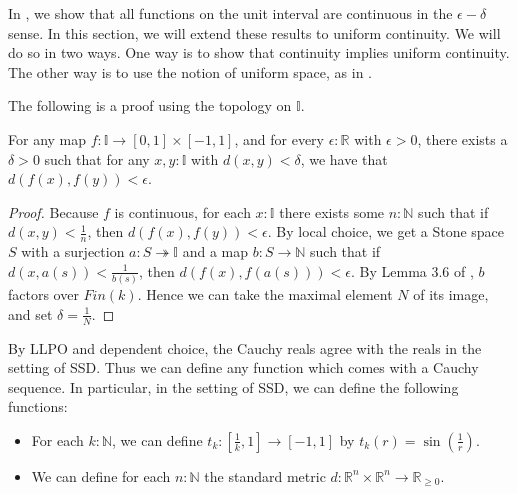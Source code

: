 In \cite{synthetic-stone-duality}, we show that all functions on the unit interval are continuous in the $\epsilon-\delta$ sense. In this section, we will extend these results to uniform continuity. We will do so in two ways. One way is to show that continuity implies uniform continuity. The other way is to use the notion of uniform space, as in \parencite[Ch2]{BourbakiTopologyCh1To4}. 



The following is a proof using the topology on $\mathbb I$. 
\begin{lemma}\label{uniformContinuity}
  For any map $f:\mathbb I \to [0,1] \times [-1,1]$, and for every $\epsilon:\mathbb R$ with $\epsilon>0$, 
  there exists a $\delta>0$ such that for any $x,y:\mathbb I$ with $d(x,y)<\delta$, we have
  that $d(f(x) , f(y))<\epsilon$.
\end{lemma}
\begin{proof}
  Because $f$ is continuous, for each $x:\mathbb I$ there exists some $n:\mathbb N$ such that 
  if $d(x,y)<\frac1n$, then $d(f(x), f(y))<\epsilon$. 
  By local choice, we get a Stone space $S$ with a surjection $a:S\twoheadrightarrow \mathbb I$ 
  and a map $b:S\to \mathbb N$ such that if $d(x,a(s))<\frac1{b(s)}$, then $d(f(x), f(a(s)))<\epsilon$. 
  By Lemma 3.6 of \cite{synthetic-stone-duality}, $b$ factors over $Fin(k)$. 
  Hence we can take the maximal element $N$ of its image, and set $\delta = \frac1N$. 
\end{proof}
\begin{remark}
  By LLPO and dependent choice, the Cauchy reals agree with the reals in the setting of SSD. Thus we can define any function which comes with a Cauchy sequence. In particular, in the setting of SSD, we can define the following functions:
  \begin{itemize}
    \item For each $k:\mathbb N$, we can define $t_k: [\frac1k , 1] \to [-1,1]$ by $t_k(r) = \sin(\frac1r)$. 
    \item We can define for each $n:\mathbb N$ the standard metric $d:\mathbb R^n \times \mathbb R^n \to \mathbb R_{\geq 0}$. 
  \end{itemize}
\end{remark}






